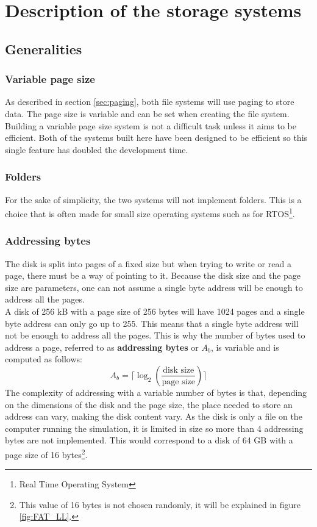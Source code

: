 \documentclass[10pt,a4paper]{ULBreport}
\begin{document}
\chapter{Description of the storage systems}

\section{Generalities}
\subsection{Variable page size}
As described in section \ref{sec:paging}, both file systems will use paging to store data. The page size is variable and can be set when creating the file system. Building a variable page size system is not a difficult task unless it aims to be efficient. Both of the systems built here have been designed to be efficient so this single feature has doubled the development time.
\subsection{Folders}
For the sake of simplicity, the two systems will not implement folders. This is a choice that is often made for small size operating systems such as for RTOS\footnote{Real Time Operating System}.
\subsection{Addressing bytes}
The disk is split into pages of a fixed size but when trying to write or read a page, there must be a way of pointing to it. Because the disk size and the page size are parameters, one can not assume a single byte address will be enough to address all the pages. \\
A disk of 256 kB with a page size of 256 bytes will have 1024 pages and a single byte address can only go up to 255. This means that a single byte address will not be enough to address all the pages. This is why the number of bytes used to address a page, referred to as \textbf{addressing bytes} or $A_b$, is variable and is computed as follows:
\begin{equation*}
    A_b = \lceil \log_2\left(\frac{\text{disk size}}{\text{page size}}\right) \rceil
\end{equation*}
The complexity of addressing with a variable number of bytes is that, depending on the dimensions of the disk and the page size, the place needed to store an address can vary, making the disk content vary. As the disk is only a file on the computer running the simulation, it is limited in size so more than 4 addressing bytes are not implemented. This would correspond to a disk of 64 GB with a page size of 16 bytes\footnote{This value of 16 bytes is not chosen randomly, it will be explained in figure \ref{fig:FAT_LL}.}.
\end{document}
